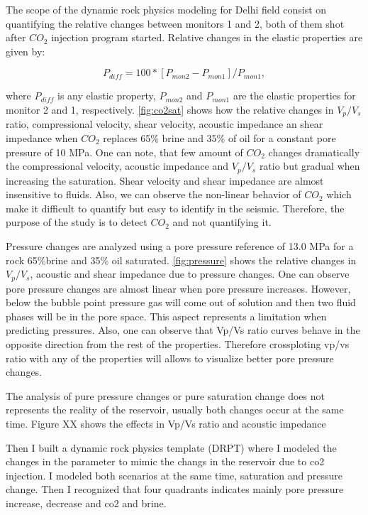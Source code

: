 The scope of the dynamic rock physics modeling for Delhi field consist on
quantifying the relative changes between monitors 1 and 2, both of them shot
after $CO_{2}$ injection program started. Relative changes in the elastic properties
are given by: 

\begin{equation}
P_{diff}= 100*[P_{mon2}-P_{mon1}]/P_{mon1},
  \label{eq:changes}
\end{equation}

where $P_{diff}$ is any elastic property, $P_{mon2}$ and $P_{mon1}$ are the elastic properties
for monitor 2 and 1, respectively. \ref{fig:co2sat} shows how the relative changes in $V_p/V_s$ ratio,
 compressional velocity, shear velocity, acoustic impedance an shear impedance 
when $CO_2$ replaces 65\% brine and 35\% of oil for a constant pore pressure of
10 MPa. One can note, that few amount of $CO_{2}$ changes dramatically the compressional 
velocity, acoustic impedance and $V_{p}/V_s$ ratio but gradual when increasing the saturation.
 Shear velocity and shear impedance are almost insensitive to fluids.
Also, we can observe the non-linear behavior of
$CO_2$ which make it difficult to quantify but easy to identify in the seismic. Therefore, the purpose
of the study is to detect $CO_2$ and not quantifying it.
  


Pressure changes are analyzed using a pore pressure reference of 13.0 MPa for a rock
65\%brine and 35\% oil saturated. \ref{fig:pressure} shows the relative changes 
in $V_p/V_s$, acoustic and shear impedance due to pressure changes. One can observe 
pore pressure changes are almost linear when pore pressure increases. However, below
the bubble point pressure gas will come out of solution and then two fluid phases will
be in the pore space. This aspect represents a limitation when predicting pressures. 
Also, one can observe that Vp/Vs ratio curves behave in the opposite direction 
from the rest of the properties. Therefore crossploting vp/vs ratio with 
any of the properties will allows to visualize better pore pressure changes. 

The analysis of pure pressure changes or pure saturation change does not represents
the reality of the reservoir, usually both changes occur at the same time. Figure XX
shows the effects in Vp/Vs ratio and acoustic impedance

 

Then I built a dynamic rock physics template (DRPT) where I modeled the changes in the parameter
to mimic the changs in the reservoir due to co2 injection. I modeled both scenarios
at the same time, saturation and pressure change. Then I recognized that four quadrants
indicates mainly pore pressure increase, decrease and co2 and brine.


